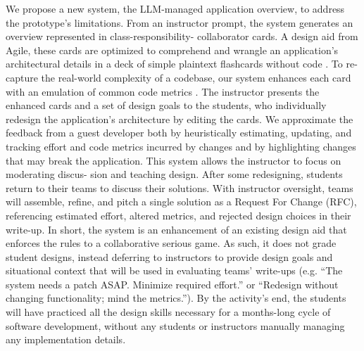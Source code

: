 We propose a new system, the LLM-managed application overview,
to address the prototype’s limitations. From an instructor prompt,
the system generates an overview represented in class-responsibility-
collaborator cards. A design aid from Agile, these cards are optimized to comprehend and wrangle an application’s architectural details in a deck of simple plaintext flashcards without code \cite{}.
To re-capture the real-world complexity of a codebase, our system enhances each card with an emulation of common code metrics \cite{}. The instructor presents the enhanced cards and a set of design goals to the students, who individually redesign the application’s architecture by editing the cards. We approximate the
feedback from a guest developer both by heuristically estimating,
updating, and tracking effort and code metrics incurred by changes
and by highlighting changes that may break the application.
This system allows the instructor to focus on moderating discus-
sion and teaching design. After some redesigning, students return
to their teams to discuss their solutions. With instructor oversight,
teams will assemble, refine, and pitch a single solution as a Request
For Change (RFC), referencing estimated effort, altered metrics, and
rejected design choices in their write-up.
In short, the system is an enhancement of an existing design aid
that enforces the rules to a collaborative serious game. As such,
it does not grade student designs, instead deferring to instructors
to provide design goals and situational context that will be used
in evaluating teams’ write-ups (e.g. “The system needs a patch
ASAP. Minimize required effort.” or “Redesign without changing
functionality; mind the metrics.”). By the activity’s end, the students
will have practiced all the design skills necessary for a months-long
cycle of software development, without any students or instructors
manually managing any implementation details.

